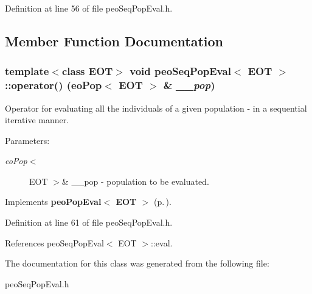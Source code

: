 Definition at line 56 of file peo\-Seq\-Pop\-Eval.h.

\subsection{Member Function Documentation}
\subsubsection{\setlength{\rightskip}{0pt plus 5cm}template$<$class EOT$>$ void {\bf peo\-Seq\-Pop\-Eval}$<$ EOT $>$::operator() (eo\-Pop$<$ EOT $>$ \& {\em \_\-\_\-pop})\hspace{0.3cm}{\tt  [virtual]}}\label{classpeo_seq_pop_eval_b2c88b9a3ad9091949acf741844eb02f}


Operator for evaluating all the individuals of a given population - in a sequential iterative manner. 

\begin{Desc}
\item[Parameters:]
\begin{description}
\item[{\em eo\-Pop$<$}]EOT $>$\& \_\-\_\-pop - population to be evaluated. \end{description}
\end{Desc}


Implements {\bf peo\-Pop\-Eval$<$ EOT $>$} {\rm (p.\,\pageref{classpeo_pop_eval_2f208067a5e39c3b26c1234050a41e8f})}.

Definition at line 61 of file peo\-Seq\-Pop\-Eval.h.

References peo\-Seq\-Pop\-Eval$<$ EOT $>$::eval.

The documentation for this class was generated from the following file:\begin{CompactItemize}
\item 
peo\-Seq\-Pop\-Eval.h\end{CompactItemize}
